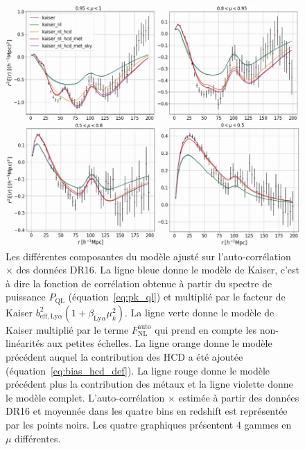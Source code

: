 \documentclass[11pt, twoside, a4paper, openright]{report}
\begin{document}
\begin{figure}
  \centering
  \includegraphics[scale=0.5]{cf_models}
  \caption{Les différentes composantes du modèle ajusté sur l'auto-corrélation \lya{}$\times$\lya{} des données DR16.
    La ligne bleue donne le modèle de Kaiser, c'est à dire la fonction de corrélation obtenue à partir du spectre de puissance $P_{\mathrm{QL}}$ (équation~\ref{eq:pk_ql}) et multiplié par le facteur de Kaiser $b_{\mathrm{eff},\mathrm{Ly}\alpha}^2 (1 + \beta_{\mathrm{Ly}\alpha} \mu_k^2)$. La ligne verte donne le modèle de Kaiser multiplié par le terme $F_{\mathrm{NL}}^{\mathrm{auto}}$ qui prend en compte les non-linéarités aux petites échelles. La ligne orange donne le modèle précédent auquel la contribution des HCD a été ajoutée (équation~\ref{eq:bias_hcd_def}). La ligne rouge donne le modèle précédent plus la contribution des métaux et la ligne violette donne le modèle complet. L'auto-corrélation \lya{}$\times$\lya{} estimée à partir des données DR16 et moyennée dans les quatre bins en redshift est représentée par les points noirs.
Les quatre graphiques présentent 4 gammes en $\mu$ différentes.}
  \label{fig:cf_models}
\end{figure}
\end{document}

